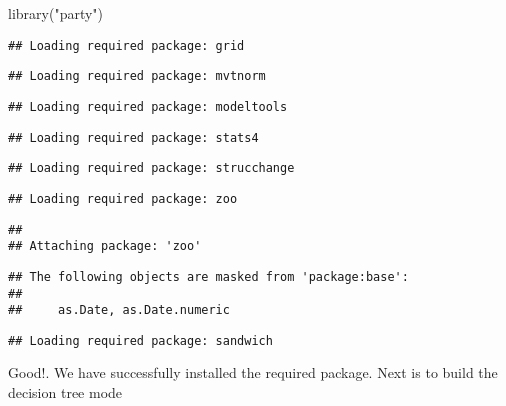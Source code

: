 \documentclass[
]{article}
\newenvironment{Shaded}{\begin{snugshade}}{\end{snugshade}}
\newcommand{\FunctionTok}[1]{\textcolor[rgb]{0.00,0.00,0.00}{#1}}
\newcommand{\NormalTok}[1]{#1}
\newcommand{\StringTok}[1]{\textcolor[rgb]{0.31,0.60,0.02}{#1}}
\begin{document}
\begin{Shaded}
\begin{Highlighting}[]
\FunctionTok{library}\NormalTok{(}\StringTok{"party"}\NormalTok{)}
\end{Highlighting}
\end{Shaded}

\begin{verbatim}
## Loading required package: grid
\end{verbatim}

\begin{verbatim}
## Loading required package: mvtnorm
\end{verbatim}

\begin{verbatim}
## Loading required package: modeltools
\end{verbatim}

\begin{verbatim}
## Loading required package: stats4
\end{verbatim}

\begin{verbatim}
## Loading required package: strucchange
\end{verbatim}

\begin{verbatim}
## Loading required package: zoo
\end{verbatim}

\begin{verbatim}
## 
## Attaching package: 'zoo'
\end{verbatim}

\begin{verbatim}
## The following objects are masked from 'package:base':
## 
##     as.Date, as.Date.numeric
\end{verbatim}

\begin{verbatim}
## Loading required package: sandwich
\end{verbatim}

Good!. We have successfully installed the required package. Next is to
build the decision tree mode
\end{document}

